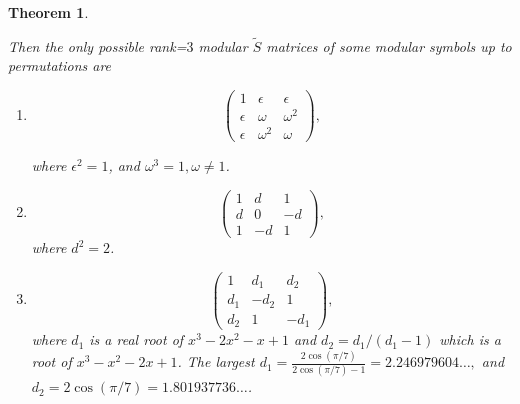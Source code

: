 \documentclass[12pt,psamsfonts]{amsart}
\newcommand{\e}{{\epsilon}}
\newcommand{\tS}{\tilde{S}}
\numberwithin{equation}{section}
\newtheorem{theorem}{Theorem}[section]
\theoremstyle{definition}
\begin{document}
 \begin{theorem}\label{Srank3}

 Then
 the only possible rank=$3$ modular $\tS$ matrices of some modular symbols up to permutations are

 \begin{enumerate}

 \item

  \[
 \begin{pmatrix}
   1& \e& \e\\
   \e& \omega &\omega^2 \\
   \e& \omega^2 &\omega
 \end{pmatrix},
 \]

 where $\e^2=1$, and $\omega^3=1, \omega\neq 1$.

 \item

 \[
 \begin{pmatrix}
   1& d & 1 \\
   d & 0 & -d \\
   1 & -d  & 1
 \end{pmatrix},
 \] where $d^2=2$.

 \item

  \[
 \begin{pmatrix}
   1& d_1 & d_2 \\
   d_1 & -d_2 & 1 \\
   d_2 & 1  & -d_1
 \end{pmatrix},
 \]
 where $d_1$ is a real root of $x^3-2 x^2 - x +1$ and $d_2=d_1/(d_1-1)$ which is a root of $x^3-x^2-2x+1$.
 The largest $d_1=\frac{2\cos(\pi/7)}{2\cos(\pi/7)-1}
=2.246979604\dots,$
and $d_2=2\cos(\pi/7)=1.801937736\dots$.
 \end{enumerate}

\end{theorem}
\end{document}
